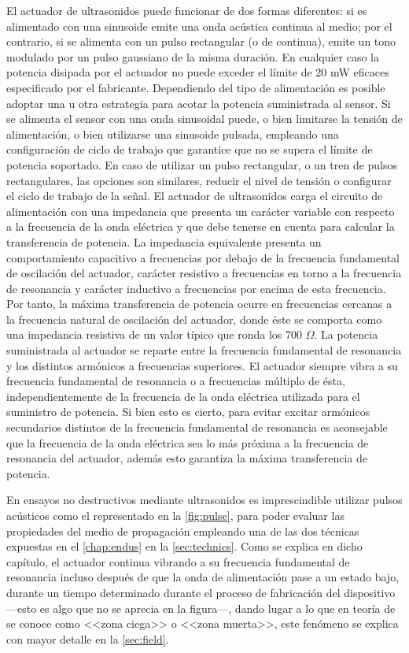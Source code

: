 El actuador de ultrasonidos puede funcionar de dos formas diferentes: si es
alimentado con una sinusoide emite una onda acústica continua al medio; por
el contrario, si se alimenta con un pulso rectangular (o de continua),
emite un tono modulado por un pulso gaussiano de la misma duración. En
cualquier caso la potencia disipada por el actuador no puede exceder el
límite de 20 mW eficaces especificado por el fabricante. Dependiendo del
tipo de alimentación es posible adoptar una u otra estrategia para acotar
la potencia suministrada al sensor. Si se alimenta el sensor con una onda
sinusoidal puede, o bien limitarse la tensión de alimentación, o bien
utilizarse una sinusoide pulsada, empleando una configuración de ciclo de
trabajo que garantice que no se supera el límite de potencia soportado. En
caso de utilizar un pulso rectangular, o un tren de pulsos rectangulares,
las opciones son similares, reducir el nivel de tensión o configurar el
ciclo de trabajo de la señal. El actuador de ultrasonidos carga el circuito
de alimentación con una impedancia que presenta un carácter variable con
respecto a la frecuencia de la onda eléctrica y que debe tenerse en cuenta
para calcular la transferencia de potencia. La impedancia equivalente
presenta un comportamiento capacitivo a frecuencias por debajo de la
frecuencia fundamental de oscilación del actuador, carácter resistivo a
frecuencias en torno a la frecuencia de resonancia y carácter inductivo a
frecuencias por encima de esta frecuencia. Por tanto, la máxima
transferencia de potencia ocurre en frecuencias cercanas a la frecuencia
natural de oscilación del actuador, donde éste se comporta como una
impedancia resistiva de un valor típico que ronda los 700 $\Omega$. La
potencia suministrada al actuador se reparte entre la frecuencia
fundamental de resonancia y los distintos armónicos a frecuencias
superiores. El actuador siempre vibra a su frecuencia fundamental de
resonancia o a frecuencias múltiplo de ésta, independientemente de la
frecuencia de la onda eléctrica utilizada para el suministro de potencia.
Si bien esto es cierto, para evitar excitar armónicos secundarios distintos
de la frecuencia fundamental de resonancia es aconsejable que la frecuencia
de la onda eléctrica sea lo más próxima a la frecuencia de resonancia del
actuador, además esto garantiza la máxima transferencia de potencia.

En ensayos no destructivos mediante ultrasonidos es imprescindible utilizar
pulsos acústicos como el representado en la \cref{fig:pulse}, para poder
evaluar las propiedades del medio de propagación empleando una de las dos
técnicas expuestas en el \cref{chap:endus} en la \cref{sec:technics}. Como
se explica en dicho capítulo, el actuador continua vibrando a su frecuencia
fundamental de resonancia incluso después de que la onda de alimentación
pase a un estado bajo, durante un tiempo determinado durante el proceso de
fabricación del dispositivo ---esto es algo que no se aprecia en la
figura---, dando lugar a lo que en teoría de  se conoce como
<<zona ciega>> o <<zona muerta>>, este fenómeno se explica con mayor
detalle en la \cref{sec:field}.

